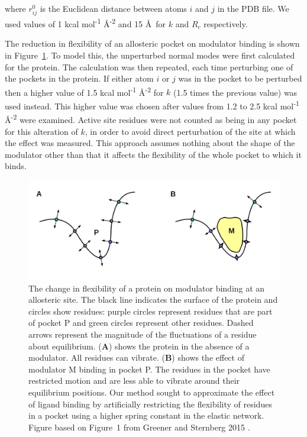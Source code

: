 where $r_{ij}^{0}$ is the Euclidean distance between atoms $i$ and $j$ in the PDB file.
We used values of 1 kcal mol\textsuperscript{-1} \AA\textsuperscript{-2} and 15 \AA\ for $k$ and $R_{c}$ respectively.

The reduction in flexibility of an allosteric pocket on modulator binding is shown in Figure~\ref{fig:ligand_binding}.
To model this, the unperturbed normal modes were first calculated for the protein.
The calculation was then repeated, each time perturbing one of the pockets in the protein.
If either atom $i$ or $j$ was in the pocket to be perturbed then a higher value of 1.5 kcal mol\textsuperscript{-1} \AA\textsuperscript{-2} for $k$ (1.5 times the previous value) was used instead.
This higher value was chosen after values from 1.2 to 2.5 kcal mol\textsuperscript{-1} \AA\textsuperscript{-2} were examined.
Active site residues were not counted as being in any pocket for this alteration of $k$, in order to avoid direct perturbation of the site at which the effect was measured.
This approach assumes nothing about the shape of the modulator other than that it affects the flexibility of the whole pocket to which it binds.


\begin{figure}
\centering

\includegraphics[width=\textwidth]{figures/ligand_binding/ligand_binding}

\caption[The change in flexibility of a protein on modulator binding at an allosteric site used as the basis for AlloPred]
{The change in flexibility of a protein on modulator binding at an allosteric site.
The black line indicates the surface of the protein and circles show residues: purple circles represent residues that are part of pocket P and green circles represent other residues.
Dashed arrows represent the magnitude of the fluctuations of a residue about equilibrium.
(\textbf{A}) shows the protein in the absence of a modulator.
All residues can vibrate.
(\textbf{B}) shows the effect of modulator M binding in pocket P.
The residues in the pocket have restricted motion and are less able to vibrate around their equilibrium positions.
Our method sought to approximate the effect of ligand binding by artificially restricting the flexibility of residues in a pocket using a higher spring constant in the elastic network.
Figure based on Figure~1 from Greener and Sternberg 2015 \cite{Greener2015}.}

\label{fig:ligand_binding}
\end{figure}


